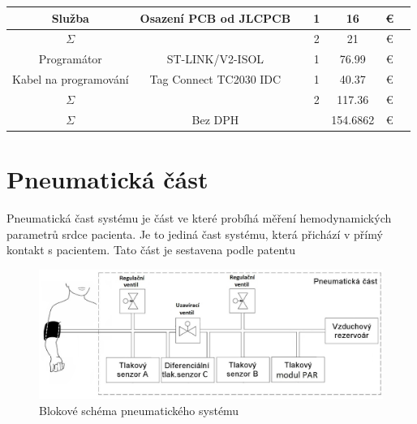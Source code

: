 \begin{table}[H]
\begin{ctucolortab}
\begin{tabular}{ccccccc}
            Služba                & Osazení PCB od JLCPCB  &               & 1     & 16       & €        & \\
            \bottomrule
            $\Sigma$              &                        &               & 2     & 21       & €        & \\
            \bottomrule
            Programátor           & ST-LINK/V2-ISOL        &               & 1     & 76.99    & €        & \\
            Kabel na programování & Tag Connect TC2030 IDC &               & 1     & 40.37    & €        & \\
            \bottomrule
            $\Sigma$              &                        &               & 2     & 117.36   & €        & \\
            \bottomrule
            \bottomrule
            $\Sigma$              & Bez DPH                &               &       & 154.6862 & €        & \\
            \bottomrule
        \end{tabular}
    \end{ctucolortab}
\end{table}
\section{Pneumatická část}
Pneumatická čast systému je část ve které probíhá měření hemodynamických parametrů srdce pacienta. Je to jediná čast systému, která přichází v přímý kontakt s pacientem. Tato část je sestavena podle
patentu \cite[US Patent US10251567]{cite:2}
\begin{figure}[H]
    \includegraphics[width=1\linewidth]{pictures/blokove_schema_pneu.jpg}
    \caption{Blokové schéma pneumatického systému}
    \label{fig:pneu_block}
\end{figure}
